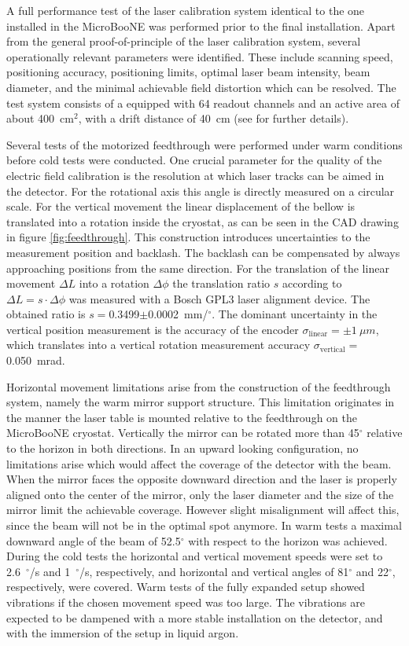 A full performance test of the laser calibration system identical to the one installed in the MicroBooNE \lartpc was performed prior to the final installation. Apart from the general proof-of-principle of the laser calibration system, several operationally relevant parameters were identified. These include scanning speed, positioning accuracy, positioning limits, optimal laser beam intensity, beam diameter, and the minimal achievable field distortion which can be resolved. The test system consists of a \lartpc equipped with 64 readout channels and an active area of about 400~cm$^2$, with a drift distance of 40~cm (see \cite{lasertest} for further details).

Several tests of the motorized feedthrough were performed under warm conditions before cold tests were conducted. One crucial parameter for the quality of the electric field calibration is the resolution at which laser tracks can be aimed in the detector. For the rotational axis this angle is directly measured on a circular scale. For the vertical movement the linear displacement of the bellow is translated into a rotation inside the cryostat, as can be seen in the CAD drawing in figure \ref{fig:feedthrough}. This construction introduces uncertainties to the measurement position and backlash. The backlash can be compensated by always approaching positions from the same direction. For the translation of the linear movement $\Delta L$ into a rotation $\Delta \phi$ the translation ratio $s$ according to $\Delta L = s \cdot \Delta \phi$ was measured with a Bosch GPL3 laser alignment device.  The obtained ratio is $s=$0.3499$\pm$0.0002~mm/$^{\circ}$. The dominant uncertainty in the vertical position measurement is the accuracy of the encoder $\sigma_{\mathrm{linear}} = \pm 1~\mu m$, which translates into a vertical rotation measurement accuracy $\sigma_{\mathrm{vertical}} =$ 0.050~mrad. 

Horizontal movement limitations arise from the construction of the feedthrough system, namely the warm mirror support structure. This limitation originates in the manner the laser table is mounted relative to the feedthrough on the MicroBooNE cryostat. Vertically the mirror can be rotated more than 45$^{\circ}$ relative to the horizon in both directions. In an upward looking configuration, no limitations arise which would affect the coverage of the detector with the beam.  When the mirror faces the opposite downward direction and the laser is properly aligned onto the center of the mirror, only the laser diameter and the size of the mirror limit the achievable coverage. However slight misalignment will affect this, since the beam will not be in the optimal spot anymore. In warm tests a maximal downward angle of the beam of 52.5$^{\circ}$ with respect to the horizon was achieved. During the cold tests the horizontal and vertical movement speeds were set to 2.6~{$^{\circ}$/s} and 1~{$^{\circ}$/s}, respectively, and horizontal and vertical angles of 81$^{\circ}$ and 22$^{\circ}$, respectively, were covered. Warm tests of the fully expanded setup showed vibrations if the chosen movement speed was too large. The vibrations are expected to be dampened with a more stable installation on the detector, and with the immersion of the setup in liquid argon.

